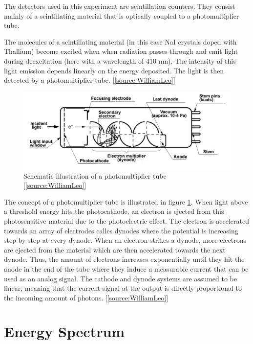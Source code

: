 \documentclass[a4paper,parskip,11pt, DIV12]{scrreprt}
\begin{document}
The detectors used in this experiment are scintillation counters. They consist mainly of a scintillating material that is optically coupled to a photomultiplier tube. 

The molecules of a scintillating material (in this case NaI crystals doped with Thallium) become excited when when radiation passes through and emit light during deexcitation (here with a wavelength of 410 nm). The intensity of this light emission depends linearly on the energy deposited. The light is then detected by a photomultiplier tube. [\ref{source:WilliamLeo}]
\begin{figure}[H]
\centering
\includegraphics[scale=1]{Photomultiplier.png}
\caption[Photomultiplier]{Schematic illustration of a photomultiplier tube [\ref{source:WilliamLeo}]}
\label{fig:Photomultiplier}
		\end{figure}
The concept of a photomultiplier tube is illustrated in figure \ref{fig:Photomultiplier}. When light above a threshold energy hits the photocathode, an electron is ejected from this photosensitive material due to the photoelectric effect. The electron is accelerated towards an array of electrodes calles dynodes where the potential is increasing step by step at every dynode. When an electron strikes a dynode, more electrons are ejected from the material which are then accelerated towards the next dynode. Thus, the amount of electrons increases exponentially until they hit the anode in the end of the tube where they induce a measurable current that can be used as an analog signal. The cathode and dynode systems are assumed to be linear, meaning that the current signal at the output is directly proportional to the incoming amount of photons. [\ref{source:WilliamLeo}]

\chapter{Energy Spectrum} \label{sec:EnergySpectrum}
\end{document}
